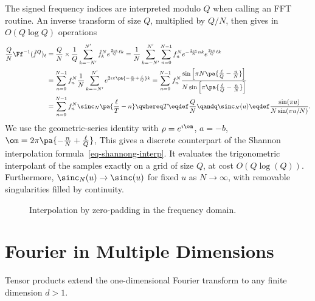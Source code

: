 The signed frequency indices are interpreted modulo $Q$ when calling an FFT routine.
An inverse transform of size $Q$, multiplied by $Q/N$, then gives in $O(Q\log Q)$ operations
\begin{align*}
	\frac{Q}{N} \Ff^{-1}( \tilde f^Q )_\ell &= 
	\frac{Q}{N} \times \frac{1}{Q} \sum_{k=-N'}^{N'} \hat f_k^N e^{ \frac{2\imath\pi}{Q} \ell k }
	= \frac{1}{N} \sum_{k=-N'}^{N'} \sum_{n=0}^{N-1} f^N_n e^{-\frac{2\imath\pi}{N} n k} e^{ \frac{2\imath\pi}{Q} \ell k }  \\
	&= \sum_{n=0}^{N-1} f^N_n \frac{1}{N} \sum_{k=-N'}^{N'} e^{ 2\imath\pi \pa{ -\frac{n}{N} + \frac{\ell}{Q} } k } 
	=  \sum_{n=0}^{N-1} f^N_n 
			\frac{ 
				\sin\left[ \pi N \pa{ \frac{\ell}{Q} - \frac{n}{N} } \right]  
			}{
				N \sin\left[ \pi \pa{ \frac{\ell}{Q} - \frac{n}{N} } \right]
			}  \\
	&= \sum_{n=0}^{N-1} f^N_n \sinc_N\pa{ \frac{\ell}{T} - n }
	\qwhereq
	T \eqdef \frac{Q}{N} \qandq \sinc_N(u) \eqdef \frac{ \sin(\pi u) }{ N \sin(\pi u /N) }.
\end{align*}
We use the geometric-series identity with $\rho=e^{\imath \om}$, $a=-b$, $\om = 2\pi \pa{ -\frac{n}{N} + \frac{\ell}{Q} }$,
This gives a discrete counterpart of the Shannon interpolation formula~\eqref{eq-shannong-interp}. It evaluates the trigonometric interpolant of the samples exactly on a grid of size $Q$, at cost $O(Q\log(Q))$. Furthermore, $\sinc_N(u)\to\sinc(u)$ for fixed $u$ as $N\to\infty$, with removable singularities filled by continuity.

\begin{figure}[tbp]
\centering
{}
\caption{Interpolation by zero-padding in the frequency domain.}
\label{fig-padding-fourier}
\end{figure}

\section{Fourier in Multiple Dimensions}
\label{sec-fourier-multiple-dim}

Tensor products extend the one-dimensional Fourier transform to any finite dimension $d>1$.


